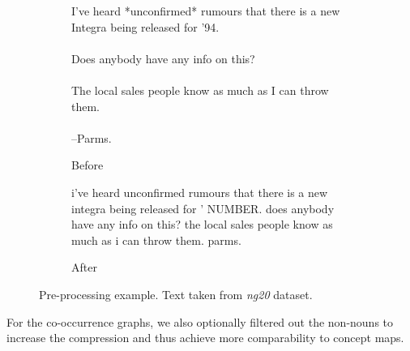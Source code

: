 \begin{figure}[htb!]
	\begin{subfigure}[b]{0.47\linewidth}
\begin{mdframed}[nobreak=true]
\textsf{I've heard *unconfirmed* rumours that there is a new Integra being released
	for '94.
	\\
	\\
	Does anybody have any info on this?
	\\
	\\
	The local sales people know as much as I can throw them.
	\\
	\\
	--Parms.}
\end{mdframed}
    \caption{Before}
    \end{subfigure}
\hspace{0.2in}
	\begin{subfigure}[b]{0.47\linewidth}
\begin{mdframed}[nobreak=true]
\textsf{i've heard unconfirmed rumours that there is a new integra being released for ' NUMBER. does anybody have any info on this? the local sales people know as much as i can throw them. parms.}
\end{mdframed}
\vspace{0.4in}
    \caption{After}
    \end{subfigure}
	\caption[Example: Pre-Processing]{Pre-processing example. Text taken from \textit{ng20} dataset.}\label{fig:preprocessing_example}
\end{figure}

For the co-occurrence graphs, we also optionally filtered out the non-nouns to increase the compression and thus achieve more comparability to concept maps.

